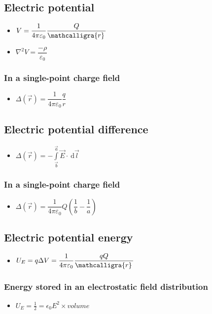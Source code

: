 \documentclass[]{report}
\newcommand \tab[1][1cm]{\hspace*{#1}}
\newcommand{\dn}[1]{\ \mathrm{d}#1}
\newcommand{\itemt}{\item \tab}
\newcommand{\scriptr}{\mathcalligra{r}\,}
\begin{document}
		\subsection{Electric potential}
        
\begin{itemize}
\itemt \( V = \dfrac{1}{4\pi\varepsilon_0} \dfrac{Q}{\scriptr} \)
\itemt \( \nabla^2 V = \dfrac{-\rho}{\varepsilon_0} \)
\end{itemize}

\subsubsection{In a single-point charge field}
\begin{itemize}
\itemt \( \Delta (\vec{r}) = \dfrac{1}{4\pi\varepsilon_0}\dfrac{q}{r} \)
\end{itemize}
        
        \subsection{Electric potential difference}
        
\begin{itemize}
\itemt \( \Delta (\vec{r}) = - \int\limits_{\vec{b}}^{\vec{a}} \vec{E}\cdot\dn \vec{l} \)
\end{itemize}

\subsubsection{In a single-point charge field}
\begin{itemize}
\itemt \( \Delta (\vec{r}) = \dfrac{1}{4\pi\varepsilon_0} Q (\dfrac{1}{b} - \dfrac{1}{a}) \)
\end{itemize}

		\subsection{Electric potential energy}
        
\begin{itemize}
\itemt \( U_E = q\Delta V = \dfrac{1}{4\pi \varepsilon_0} \dfrac{qQ}{\scriptr} \)
\end{itemize}

\subsubsection{Energy stored in an electrostatic field distribution}
\begin{itemize}
\itemt \( U_E = \frac{1}{2} =\epsilon_0 E^2 \times volume \)
\end{itemize}
\end{document}
